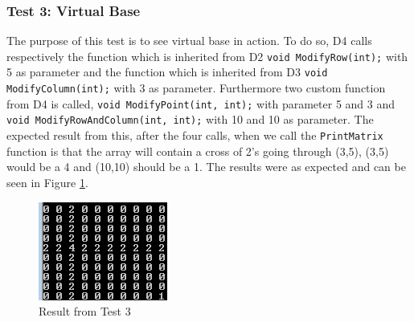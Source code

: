 \subsubsection{Test 3: Virtual Base}
The purpose of this test is to see virtual base in action.
To do so, D4 calls respectively the function which is inherited from D2 \lstinline$void ModifyRow(int);$ with 5 as parameter and the function which is inherited from D3 \lstinline$void ModifyColumn(int);$ with 3 as parameter.
Furthermore two custom function from D4 is called, \lstinline$void ModifyPoint(int, int);$ with parameter 5 and 3 and \lstinline$void ModifyRowAndColumn(int, int);$ with 10 and 10 as parameter.
The expected result from this, after the four calls, when we call the \lstinline$PrintMatrix$ function is that the array will contain a cross of 2's going through (3,5), (3,5) would be a 4 and (10,10) should be a 1.
The results were as expected and can be seen in Figure \ref{test3}.
\begin{figure}[H]  
\centering
\includegraphics[scale=0.8]{grafik/resultTest3}
\caption{Result from Test 3}
\label{test3}
\end{figure}

